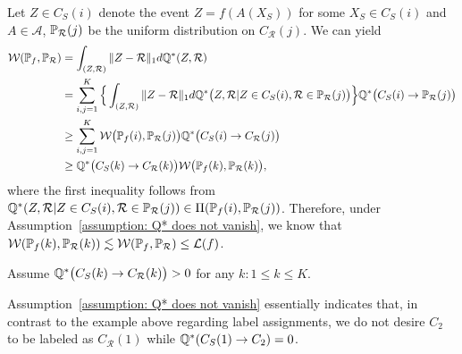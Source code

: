 Let $Z \in C_S(i)$ denote the event $Z = f(A(X_S))$ for some $X_S \in C_S(i)$ and $A \in \mathcal{A}$, $\P_\mathcal{R}(j)$ be the uniform distribution on $C_\mathcal{R}(j)$. We can yield
\begin{align}
    \label{eq: ovarall Wasserstein vs conditional Wasserstein}
    \mathcal{W}(\P_f, \P_\mathcal{R}) &= \int_{(Z, \mathcal{R})}\norm{Z - \mathcal
    R}_1 d\Q^*(Z, \mathcal
    R) \nonumber \\
    &= \sum_{i,j=1}^K\Big\{\int_{(Z, \mathcal{R})}\norm{Z - \mathcal
    R}_1d\Q^*\big(Z, \mathcal{R} \vert Z \in C_S(i), \mathcal{R}\in \P_\mathcal{R}(j)\big)\Big\}\Q^*\big(C_S(i) \to \P_\mathcal{R}(j)\big) \nonumber \\
    &\geq \sum_{i,j=1}^K\mathcal{W}\big(\P_f(i), \P_\mathcal{R}(j)\big)\Q^*\big(C_S(i) \to C_\mathcal{R}(j)\big) \nonumber \\
    &\geq \Q^*\big(C_S(k) \to C_\mathcal{R}(k)\big)\mathcal{W}\big(\P_f(k), \P_\mathcal{R}(k)\big),
\end{align}
where the first inequality follows from $\Q^*(Z, \mathcal{R} \vert Z \in C_S(i), \mathcal{R} \in \P_\mathcal{R}(j)) \in \Pi(\P_f(i), \P_\mathcal{R}(j))$. Therefore, under Assumption~\ref{assumption: Q* does not vanish}, we know that $\mathcal{W}(\P_f(k), \P_\mathcal{R}(k)) \lesssim \mathcal{W}(\P_f, \P_\mathcal{R}) \leq \mathcal{L}(f)$.
\begin{assumption}
    \label{assumption: Q* does not vanish}
    Assume $\Q^*\big(C_S(k) \to C_\mathcal{R}(k)\big) > 0$ for any $k : 1 \leq k \leq K$.
\end{assumption}
Assumption~\ref{assumption: Q* does not vanish} essentially indicates that, in contrast to the example above regarding label assignments, we do not desire $C_2$ to be labeled as $C_\mathcal{R}(1)$ while $\Q^*(C_S(1) \to C_2) = 0$. 

